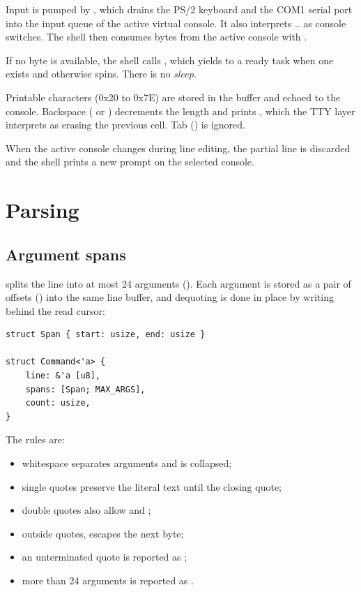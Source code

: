Input is pumped by , which drains the PS/2 keyboard and
the COM1 serial port into the input queue of the active virtual console. It
also interprets .. as console switches. The shell
then consumes bytes from the active console with .

If no byte is available, the shell calls , which yields to
a ready task when one exists and otherwise spins. There is no \emph{sleep}.

Printable characters (0x20 to 0x7E) are stored in the buffer and echoed to
the console. Backspace ( or ) decrements the length and
prints , which the TTY layer interprets as erasing
the previous cell. Tab () is ignored.

When the active console changes during line editing, the partial line is
discarded and the shell prints a new prompt on the selected console.

\section{Parsing}

\subsection{Argument spans}

 splits the line into at most 24 arguments
(). Each argument is stored as a pair of offsets
() into the same line buffer, and dequoting is done in place by
writing behind the read cursor:

\begin{lstlisting}[caption={Argument parsing with quotes and escapes.},label={lst:parse}]
struct Span { start: usize, end: usize }

struct Command<'a> {
    line: &'a [u8],
    spans: [Span; MAX_ARGS],
    count: usize,
}
\end{lstlisting}

The rules are:

\begin{itemize}
  \item whitespace separates arguments and is collapsed;
  \item single quotes preserve the literal text until the closing quote;
  \item double quotes also allow  and
        \code{\textbackslash \textbackslash};
  \item outside quotes, \code{\textbackslash} escapes the next byte;
  \item an unterminated quote is reported as ;
  \item more than 24 arguments is reported as .
\end{itemize}

